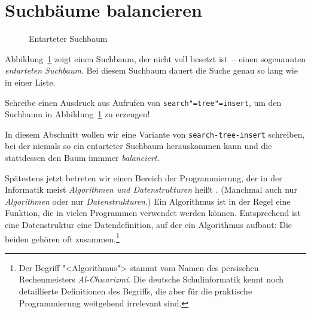 \section{Suchbäume balancieren}

\begin{figure}[tb]
  \caption{Entarteter Suchbaum}
  \label{fig:degenerated-searchtree}
\end{figure}

Abbildung~\ref{fig:degenerated-searchtree} zeigt einen Suchbaum, der
nicht voll besetzt ist~-- einen sogenannten \textit{entarteten
  Suchbaum}. Bei
diesem Suchbaum dauert die Suche genau so lang wie in einer Liste.
%
\begin{aufgabeinline}
  Schreibe einen Ausdruck aus Aufrufen von
  \texttt{search"=tree"=insert}, um den Suchbaum in
  Abbildung~\ref{fig:degenerated-searchtree} zu erzeugen!
\end{aufgabeinline}
%
In diesem Abschnitt wollen wir eine Variante von
\lstinline{search-tree-insert} schreiben, bei der niemals so ein
entarteter Suchbaum herauskommen kann und die stattdessen den Baum
immmer \textit{balanciert}.

Spätestens jetzt betreten wir einen Bereich der Programmierung, der in
der Informatik meist \textit{Algorithmen und Datenstrukturen} heißt
\cite{BirdGibbons2020}.
(Manchmal auch nur \textit{Algorithmen} oder nur
\textit{Datenstrukturen}.)  Ein Algorithmus ist in der Regel eine
Funktion, die in vielen Programmen verwendet werden können.
Entsprechend ist eine Datenstruktur eine Datendefinition, auf der ein
Algorithmus aufbaut: Die beiden gehören oft zusammen.\footnote{Der
  Begriff "<Algorithmus"> stammt vom Namen des persischen
  Rechenmeisters \textit{Al-Chwarizmi}.  Die deutsche Schulinformatik
  kennt noch detaillierte Definitionen des Begriffs, die aber für die
  praktische Programmierung weitgehend irrelevant sind.}

